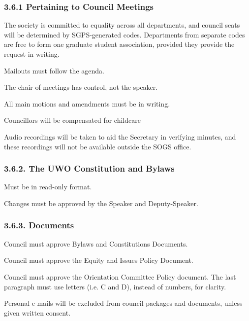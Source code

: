 \subsubsection{3.6.1	Pertaining to Council Meetings}
\begin{longenum}[ label*=\thesubsubsection.\arabic*., align=left]
\item  	The society is committed to equality across all departments, and council seats will be determined by SGPS-generated codes. Departments from separate codes are free to form one graduate student association, provided they provide the request in writing.
\item 	Mailouts must follow the agenda.  
\item 	The chair of meetings has control, not the speaker. 
\item 	All main motions and amendments must be in writing.  
\item 	Councillors will be compensated for childcare 
\item 	Audio recordings will be taken to aid the Secretary in verifying minutes, and these recordings will not be available outside the SOGS office.  
\end{longenum}

\subsubsection{ 3.6.2. The UWO Constitution and Bylaws}
\begin{longenum}[ label*=\thesubsubsection.\arabic*., align=left]
\item   	Must be in read-only format.
\item 	Changes must be approved by the Speaker and Deputy-Speaker.
 
\end{longenum}

\subsubsection{ 3.6.3. Documents}
\begin{longenum}[ label*=\thesubsubsection.\arabic*., align=left]
\item   	Council must approve Bylaws and Constitutions Documents. 
\item 	Council must approve the Equity and Issues Policy Document.
\item 	Council must approve the Orientation Committee Policy document. The last paragraph must use letters (i.e. C and D), instead of numbers, for clarity.
\item 	Personal e-mails will be excluded from council packages and documents, unless given written consent. 

\end{longenum}

